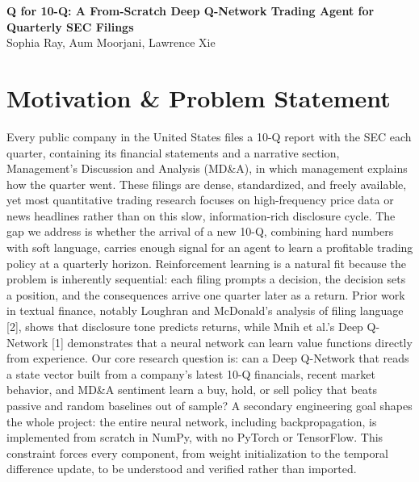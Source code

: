 \documentclass[11pt, letterpaper]{article}
\begin{document}
\begin{center}
  {\Large\bfseries\color{headcolor} Q for 10-Q: A From-Scratch Deep Q-Network Trading Agent for Quarterly SEC Filings}\\[4pt]
  {\normalsize Sophia Ray, Aum Moorjani, Lawrence Xie}\\[2pt]
\end{center}

\vspace{4pt}

\section{Motivation \& Problem Statement}

Every public company in the United States files a 10-Q report with the SEC each quarter, containing its financial statements and a narrative section, Management's Discussion and Analysis (MD\&A), in which management explains how the quarter went. These filings are dense, standardized, and freely available, yet most quantitative trading research focuses on high-frequency price data or news headlines rather than on this slow, information-rich disclosure cycle. The gap we address is whether the arrival of a new 10-Q, combining hard numbers with soft language, carries enough signal for an agent to learn a profitable trading policy at a quarterly horizon. Reinforcement learning is a natural fit because the problem is inherently sequential: each filing prompts a decision, the decision sets a position, and the consequences arrive one quarter later as a return. Prior work in textual finance, notably Loughran and McDonald's analysis of filing language [2], shows that disclosure tone predicts returns, while Mnih et al.'s Deep Q-Network [1] demonstrates that a neural network can learn value functions directly from experience. Our core research question is: can a Deep Q-Network that reads a state vector built from a company's latest 10-Q financials, recent market behavior, and MD\&A sentiment learn a buy, hold, or sell policy that beats passive and random baselines out of sample? A secondary engineering goal shapes the whole project: the entire neural network, including backpropagation, is implemented from scratch in NumPy, with no PyTorch or TensorFlow. This constraint forces every component, from weight initialization to the temporal difference update, to be understood and verified rather than imported.

\end{document}
